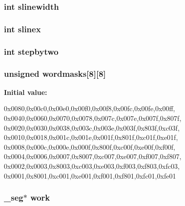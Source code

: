 \label{OLDSCALE_8C_a79aa20f0658411ee8fe8706f15753026}
\hypertarget{OLDSCALE_8C_abd65d74dcd32e5501a3ecec638d65b0e}{
\subsubsection[{slinewidth}]{\setlength{\rightskip}{0pt plus 5cm}int {\bf slinewidth}}}
\label{OLDSCALE_8C_abd65d74dcd32e5501a3ecec638d65b0e}
\hypertarget{OLDSCALE_8C_aaec68c7e7f5e78b99df5b9ed716b35d2}{
\subsubsection[{slinex}]{\setlength{\rightskip}{0pt plus 5cm}int {\bf slinex}}}
\label{OLDSCALE_8C_aaec68c7e7f5e78b99df5b9ed716b35d2}
\hypertarget{OLDSCALE_8C_aa80a217b0adae9ee21e078108c9ef3c5}{
\subsubsection[{stepbytwo}]{\setlength{\rightskip}{0pt plus 5cm}int {\bf stepbytwo}}}
\label{OLDSCALE_8C_aa80a217b0adae9ee21e078108c9ef3c5}
\hypertarget{OLDSCALE_8C_a1c8053b1c5185cc1701015d26ca61eb0}{
\subsubsection[{wordmasks}]{\setlength{\rightskip}{0pt plus 5cm}unsigned {\bf wordmasks}\mbox{[}8\mbox{]}\mbox{[}8\mbox{]}}}
\label{OLDSCALE_8C_a1c8053b1c5185cc1701015d26ca61eb0}
{\bfseries Initial value:}
\begin{DoxyCode}
 {
{0x0080,0x00c0,0x00e0,0x00f0,0x00f8,0x00fc,0x00fe,0x00ff},
{0x0040,0x0060,0x0070,0x0078,0x007c,0x007e,0x007f,0x807f},
{0x0020,0x0030,0x0038,0x003c,0x003e,0x003f,0x803f,0xc03f},
{0x0010,0x0018,0x001c,0x001e,0x001f,0x801f,0xc01f,0xe01f},
{0x0008,0x000c,0x000e,0x000f,0x800f,0xc00f,0xe00f,0xf00f},
{0x0004,0x0006,0x0007,0x8007,0xc007,0xe007,0xf007,0xf807},
{0x0002,0x0003,0x8003,0xc003,0xe003,0xf003,0xf803,0xfc03},
{0x0001,0x8001,0xc001,0xe001,0xf001,0xf801,0xfc01,0xfe01} }
\end{DoxyCode}
\hypertarget{OLDSCALE_8C_a163511d4eb7f7ce00c635dc774a864c6}{
\subsubsection[{work}]{ \_\-seg$\ast$ {\bf work}}}
\label{OLDSCALE_8C_a163511d4eb7f7ce00c635dc774a864c6}
